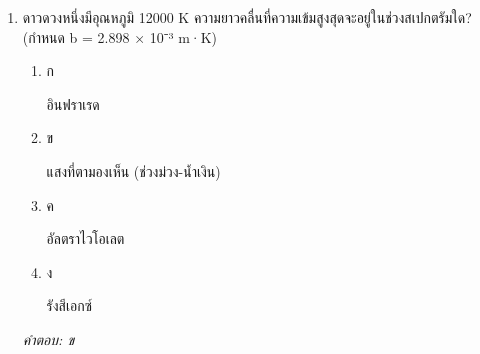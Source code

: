 \documentclass[12pt]{article}
\begin{document}
\begin{enumerate}[label=\arabic*., itemsep=0.5\baselineskip, topsep=0.5\baselineskip, leftmargin=*]
\item ดาวดวงหนึ่งมีอุณหภูมิ 12000 K ความยาวคลื่นที่ความเข้มสูงสุดจะอยู่ในช่วงสเปกตรัมใด? (กำหนด b = 2.898 × 10⁻³ m·K)
\begin{enumerate}[label=\alph*)., itemsep=0.3\baselineskip, topsep=0.3\baselineskip]
\item ก\ 
\begin{minipage}[t]{0.9\linewidth}
\raggedright อินฟราเรด
\end{minipage}
\item ข\ 
\begin{minipage}[t]{0.9\linewidth}
\raggedright แสงที่ตามองเห็น (ช่วงม่วง-น้ำเงิน)
\end{minipage}
\item ค\ 
\begin{minipage}[t]{0.9\linewidth}
\raggedright อัลตราไวโอเลต
\end{minipage}
\item ง\ 
\begin{minipage}[t]{0.9\linewidth}
\raggedright รังสีเอกซ์
\end{minipage}
\end{enumerate}
\vspace{-0.3\baselineskip}
\begin{small}
\textit{คำตอบ: ข}
\end{small}

\end{enumerate}
\end{document}
